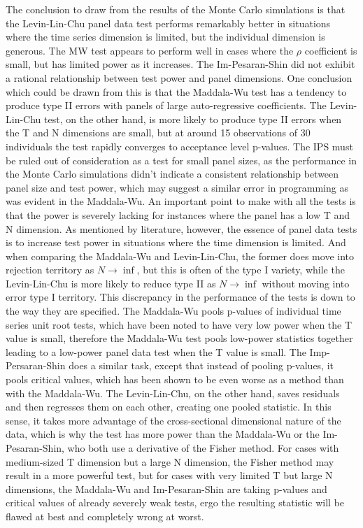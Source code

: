 The conclusion to draw from the results of the Monte Carlo simulations is that the Levin-Lin-Chu panel data test performs remarkably better in situations where the time series dimension is limited, but the individual dimension is generous. The MW test appears to perform well in cases where the $\rho$ coefficient is small, but has limited power as it increases. The Im-Pesaran-Shin did not exhibit a rational relationship between test power and panel dimensions. One conclusion which could be drawn from this is that the Maddala-Wu test has a tendency to produce type II errors with panels of large auto-regressive coefficients. The Levin-Lin-Chu test, on the other hand, is more likely to produce type II errors when the T and N dimensions are small, but at around 15 observations of 30 individuals the test rapidly converges to acceptance level p-values. The IPS must be ruled out of consideration as a test for small panel sizes, as the performance in the Monte Carlo simulations didn’t indicate a consistent relationship between panel size and test power, which may suggest a similar error in programming as was evident in the Maddala-Wu. An important point to make with all the tests is that the power is severely lacking for instances where the panel has a low T and N dimension. As mentioned by literature, however, the essence of panel data tests is to increase test power in situations where the time dimension is limited. And when comparing the Maddala-Wu and Levin-Lin-Chu, the former does move into rejection territory as $N \to \inf$, but this is often of the type I variety, while the Levin-Lin-Chu is more likely to reduce type II as $N \to \inf$ without moving into error type I territory. This discrepancy in the performance of the tests is down to the way they are specified. The Maddala-Wu pools p-values of individual time series unit root tests, which have been noted to have very low power when the T value is small, therefore the Maddala-Wu test pools low-power statistics together leading to a low-power panel data test when the T value is small. The Imp-Persaran-Shin does a similar task, except that instead of pooling p-values, it pools critical values, which has been shown to be even worse as a method than with the Maddala-Wu. The Levin-Lin-Chu, on the other hand, saves residuals and then regresses them on each other, creating one pooled statistic. In this sense, it takes more advantage of the cross-sectional dimensional nature of the data, which is why the test has more power than the Maddala-Wu or the Im-Pesaran-Shin, who both use a derivative of the Fisher method. For cases with medium-sized T dimension but a large N dimension, the Fisher method may result in a more powerful test, but for cases with very limited T but large N dimensions, the Maddala-Wu and Im-Pesaran-Shin are taking p-values and critical values of already severely weak tests, ergo the resulting statistic will be flawed at best and completely wrong at worst.

